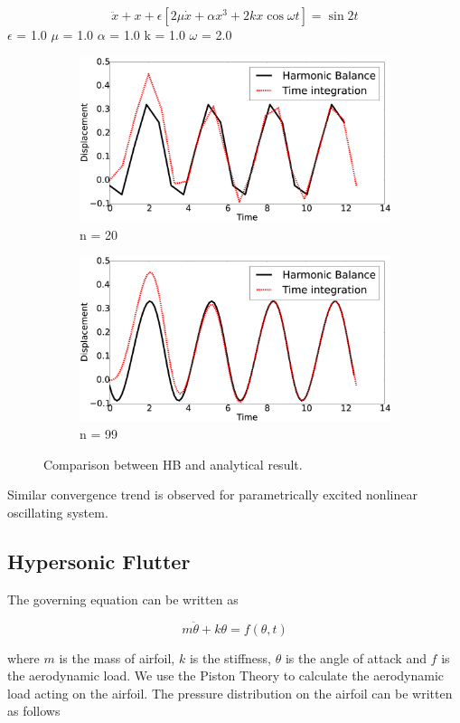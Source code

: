 \documentclass[12pt, a4paper]{extarticle}
\begin{document}
\begin{equation}
	\ddot{x} + x + \epsilon \left[ 2 \mu \dot{x} + \alpha x^3 + 2 k x \cos \omega t \right] = \sin 2t	
\end{equation}
$\epsilon$ = 1.0
$\mu$ = 1.0
$\alpha$ = 1.0
k = 1.0
$\omega$ = 2.0
\begin{figure}[H]
	\centering
	\begin{subfigure}[h]{8.0 cm}
		\includegraphics[width=8.0 cm]{figure/3N20.eps}
		\caption{n = 20}
	\end{subfigure}
	\begin{subfigure}[h]{8.0 cm}
        \includegraphics[width=8.0 cm]{figure/3N99.eps}
		\caption{n = 99}
    \end{subfigure}
    \caption{Comparison between HB and analytical result.}
    \label{fig:R2}
\end{figure}
{Similar convergence trend is observed for parametrically excited nonlinear oscillating system.}
\subsection{Hypersonic Flutter}
The governing equation can be written as

\begin{equation}\label{eq:GE}
	m\ddot{\theta} + k \theta = f(\theta, t)
\end{equation}

where $m$ is the mass of airfoil, $k$ is the stiffness, $\theta$ is the angle of attack and $f$ is the aerodynamic load. We use the Piston Theory to calculate the aerodynamic load acting on the airfoil. The pressure distribution on the airfoil can be written as follows
\end{document}

